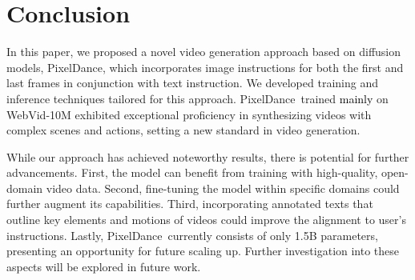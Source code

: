 \documentclass[10pt,twocolumn,letterpaper]{article}
\newcommand{\tcb}{\textcolor{black}}
\newcommand{\ours}{{PixelDance}}
\begin{document}
 \section{Conclusion}

In this paper, we proposed a novel video generation approach based on diffusion models, \ours, which incorporates image instructions for both the first and last frames in conjunction with text instruction. We developed training and inference techniques tailored for this approach. \ours~trained \tcb{mainly} on WebVid-10M exhibited exceptional proficiency in synthesizing videos with complex scenes and actions, setting a new standard in video generation. 


While our approach has achieved noteworthy results, there is potential for further advancements. First, the model can benefit from training with high-quality, open-domain video data. Second, 
fine-tuning the model within specific domains could further augment its capabilities. Third, incorporating
annotated texts that outline key elements and motions of videos could improve the alignment to user's instructions.
Lastly, \ours~currently consists of only 1.5B parameters, presenting an opportunity for future scaling up. 
Further investigation into these aspects will be explored in future work.


 

{
    \small
    
    
}
\end{document}
